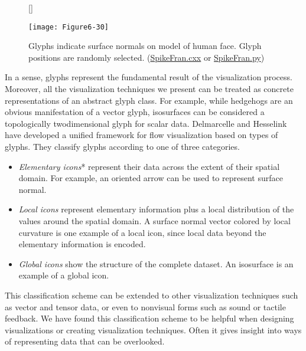 \begin{figure}[!htb]
	[\FBwidth]
	{\caption{Glyphs indicate surface normals on model of human face. Glyph positions are randomly selected. (\href{https://lorensen.github.io/VTKExamples/site/Cxx/VisualizationAlgorithms/SpikeFran/}{SpikeFran.cxx} or \href{https://lorensen.github.io/VTKExamples/site/Python/VisualizationAlgorithms/SpikeFran/}{SpikeFran.py})}\label{fig:Figure6-30}}
	{\texttt{[image: Figure6-30]}}
\end{figure}

In a sense, glyphs represent the fundamental result of the visualization process. Moreover, all the visualization techniques we present can be treated as concrete representations of an abstract glyph class. For example, while hedgehogs are an obvious manifestation of a vector glyph, isosurfaces can be considered a topologically twodimensional glyph for scalar data. Delmarcelle and Hesselink \cite{Delmarcelle95} have developed a unified framework for flow visualization based on types of glyphs. They classify glyphs according to one of three categories.

\begin{itemize}

\item \emph{Elementary icons}* represent their data across the extent of their spatial domain. For example, an oriented arrow can be used to represent surface normal.

\item \emph{Local icons} represent elementary information plus a local distribution of the values around the spatial domain. A surface normal vector colored by local curvature is one example of a local icon, since local data beyond the elementary information is encoded.

\item \emph{Global icons} show the structure of the complete dataset. An isosurface is an example of a global icon.

\end{itemize}

This classification scheme can be extended to other visualization techniques such as vector and tensor data, or even to nonvisual forms such as sound or tactile feedback. We have found this classification scheme to be helpful when designing visualizations or creating visualization techniques. Often it gives insight into ways of representing data that can be overlooked.

